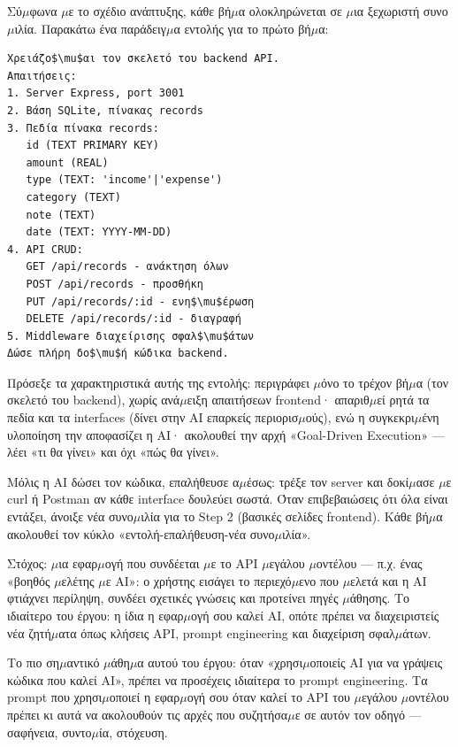 
Σύ$\mu$φωνα $\mu$ε το σχέδιο ανάπτυξης, κάθε βή$\mu$α ολοκληρώνεται σε $\mu$ια ξεχωριστή συνο$\mu$ιλία. Παρακάτω ένα παράδειγ$\mu$α εντολής για το πρώτο βή$\mu$α:

\begin{lstlisting}
Χρειάζο$\mu$αι τον σκελετό του backend API.
Απαιτήσεις:
1. Server Express, port 3001
2. Βάση SQLite, πίνακας records
3. Πεδία πίνακα records:
   id (TEXT PRIMARY KEY)
   amount (REAL)
   type (TEXT: 'income'|'expense')
   category (TEXT)
   note (TEXT)
   date (TEXT: YYYY-MM-DD)
4. API CRUD:
   GET /api/records - ανάκτηση όλων
   POST /api/records - προσθήκη
   PUT /api/records/:id - ενη$\mu$έρωση
   DELETE /api/records/:id - διαγραφή
5. Middleware διαχείρισης σφαλ$\mu$άτων
Δώσε πλήρη δο$\mu$ή κώδικα backend.
\end{lstlisting}

Πρόσεξε τα χαρακτηριστικά αυτής της εντολής: περιγράφει $\mu$όνο το τρέχον βή$\mu$α (τον σκελετό του backend), χωρίς ανά$\mu$ειξη απαιτήσεων frontend· απαριθ$\mu$εί ρητά τα πεδία και τα interfaces (δίνει στην AI επαρκείς περιορισ$\mu$ούς), ενώ η συγκεκρι$\mu$ένη υλοποίηση την αποφασίζει η AI· ακολουθεί την αρχή «Goal-Driven Execution» — λέει «τι θα γίνει» και όχι «πώς θα γίνει».

Μόλις η AI δώσει τον κώδικα, επαλήθευσε α$\mu$έσως: τρέξε τον server και δοκί$\mu$ασε $\mu$ε curl ή Postman αν κάθε interface δουλεύει σωστά. Όταν επιβεβαιώσεις ότι όλα είναι εντάξει, άνοιξε νέα συνο$\mu$ιλία για το Step 2 (βασικές σελίδες frontend). Κάθε βή$\mu$α ακολουθεί τον κύκλο «εντολή-επαλήθευση-νέα συνο$\mu$ιλία».



Στόχος: $\mu$ια εφαρ$\mu$ογή που συνδέεται $\mu$ε το API $\mu$εγάλου $\mu$οντέλου — π.χ. ένας «βοηθός $\mu$ελέτης $\mu$ε AI»: ο χρήστης εισάγει το περιεχό$\mu$ενο που $\mu$ελετά και η AI φτιάχνει περίληψη, συνδέει σχετικές γνώσεις και προτείνει πηγές $\mu$άθησης. Το ιδιαίτερο του έργου: η ίδια η εφαρ$\mu$ογή σου καλεί AI, οπότε πρέπει να διαχειριστείς νέα ζητή$\mu$ατα όπως κλήσεις API, prompt engineering και διαχείριση σφαλ$\mu$άτων.

Το πιο ση$\mu$αντικό $\mu$άθη$\mu$α αυτού του έργου: όταν «χρησι$\mu$οποιείς AI για να γράψεις κώδικα που καλεί AI», πρέπει να προσέχεις ιδιαίτερα το prompt engineering. Τα prompt που χρησι$\mu$οποιεί η εφαρ$\mu$ογή σου όταν καλεί το API του $\mu$εγάλου $\mu$οντέλου πρέπει κι αυτά να ακολουθούν τις αρχές που συζητήσα$\mu$ε σε αυτόν τον οδηγό — σαφήνεια, συντο$\mu$ία, στόχευση.

